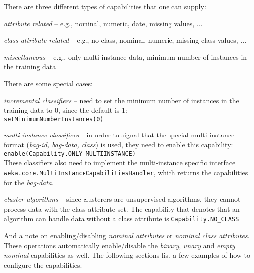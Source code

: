 \noindent There are three different types of capabilities that one can supply:
\begin{tight_enumerate}
  \item \textit{attribute related} -- e.g., nominal, numeric, date, missing
values, ...
  \item \textit{class attribute related} -- e.g., no-class, nominal, numeric,
missing class values, ...
  \item \textit{miscellaneous} -- e.g., only multi-instance data, minimum number
of instances in the training data
\end{tight_enumerate}
There are some special cases:
\begin{tight_itemize}
  \item \textit{incremental classifiers} -- need to set the minimum number of
instances in the training data to 0, since the default is 1: \\
  \texttt{setMinimumNumberInstances(0)}
  
  \item \textit{multi-instance classifiers} -- in order to signal that the
special multi-instance format (\textit{bag-id, bag-data, class}) is used, they
need to enable this capability: \\
  \texttt{enable(Capability.ONLY\_MULTIINSTANCE)} \\
  These classifiers also need to implement the multi-instance specific interface
\texttt{weka.core.MultiInstanceCapabilitiesHandler}, which returns the
capabilities for the \textit{bag-data}.

  \item \textit{cluster algorithms} -- since clusterers are unsupervised
algorithms, they cannot process data with the class attribute set. The
capability that denotes that an algorithm can handle data without a class
attribute is \texttt{Capability.NO\_CLASS}
\end{tight_itemize}
And a note on enabling/disabling \textit{nominal attributes} or \textit{nominal
class attributes}. These operations automatically enable/disable the
\textit{binary}, \textit{unary} and \textit{empty nominal} capabilities as well.
The following sections list a few examples of how to configure the capabilities.

\newpage
